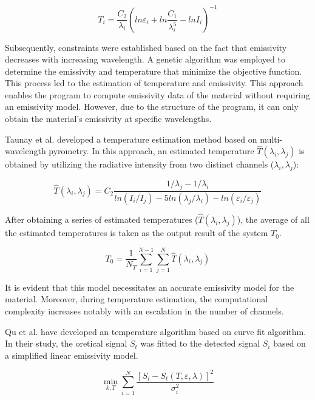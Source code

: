 \begin{equation}
    T_i=\frac{C_2}{\lambda_i}\left(ln\varepsilon_i + ln\frac{C_1}{\lambda^5_i} - lnI_i\right)^{-1}
\end{equation}


Subsequently, constraints were established based on the fact that emissivity 
decreases with increasing wavelength. A genetic algorithm was employed to 
determine the emissivity and temperature that minimize the objective 
function. This process led to the estimation of temperature and emissivity.
This approach enables the program to compute emissivity data of the material 
without requiring an emissivity model. However, due to the structure of 
the program, it can only obtain the material's emissivity at specific 
wavelengths.


Taunay et al. developed a temperature estimation method based on 
multi-wavelength pyrometry\cite{Taunay.2020b}. In this approach, 
an estimated temperature $\widehat{T}(\lambda_i, \lambda_j)$ is obtained by utilizing the radiative intensity 
from two distinct channels ($\lambda_i, \lambda_j$):

\begin{equation}
    \widehat{T}(\lambda_i, \lambda_j)=C_2 \frac{1/\lambda_j - 1/\lambda_i}{ln(I_i/I_j) - 5ln(\lambda_j / \lambda_i) - ln(\varepsilon_i / \varepsilon_j)}
\end{equation}


After obtaining a series of estimated temperatures ($\widehat{T}(\lambda_i, \lambda_j)$), 
the average of all the estimated temperatures is taken as the output result of the system $T_0$.

\begin{equation}
    T_0 = \frac{1}{N_T}\sum_{i = 1}^{N-1} \sum_{j = 1}^{N} \widehat{T}(\lambda_i, \lambda_j) 
\end{equation}

It is evident that this model necessitates an accurate emissivity model for the material. Moreover, during 
temperature estimation\cite{Taunay.2020b}, the computational complexity increases notably 
with an escalation in the number of channels.


Qu et al. have developed an temperature algorithm based on curve fit algorithm\cite{Qu.2020}.
In their study, the oretical signal $S_t$ was fitted to the detected signal $S_i$ based on 
a simplified linear emissivity model. 

\begin{equation}
    \label{eq: curve_fit_Qu}
    \min_{k, T}\sum_{i=1}^{N}  \frac{[S_i - S_t(T, \varepsilon, \lambda)]^2}{\sigma^2_i}
\end{equation} 

